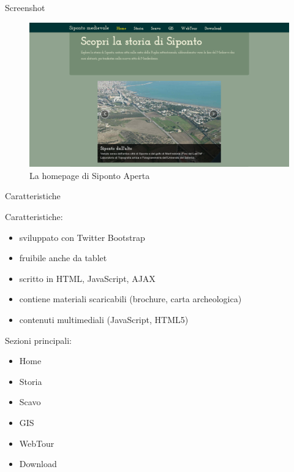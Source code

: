 \documentclass{beamer}
\begin{document}
		\begin{frame}{Screenshot}
			\begin{figure}[]
				\begin{center}
					\includegraphics[width=1\linewidth]{screen_sip}
				\end{center}
				\caption{La homepage di Siponto Aperta}
				\label{fig:sip_screen}
			\end{figure}
		\end{frame}

		\begin{frame}{Caratteristiche}
			\begin{multicols}{2}[][]
				Caratteristiche:
				\begin{itemize}
					\item sviluppato con Twitter Bootstrap
					\item fruibile anche da tablet
					\item scritto in HTML, JavaScript, AJAX
					\item contiene materiali scaricabili (brochure, carta archeologica)
					\item contenuti multimediali (JavaScript, HTML5)
				\end{itemize}
				\columnbreak
				Sezioni principali:
				\begin{itemize}
					\item Home
					\item Storia
					\item Scavo
					\item GIS
					\item WebTour
					\item Download
				\end{itemize}
			\end{multicols}
		\end{frame}
\end{document}
